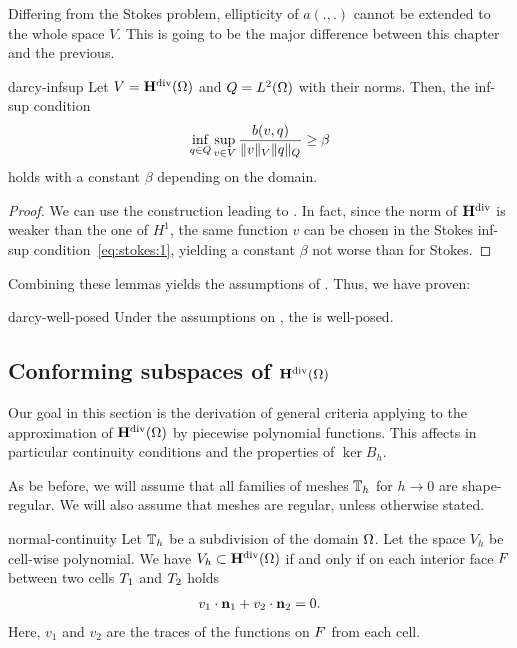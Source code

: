 \begin{remark}
  Differing from the Stokes problem, ellipticity of $a(.,.)$ cannot be
  extended to the whole space $V$. This is going to be the major
  difference between this chapter and the previous.
\end{remark}

\begin{Lemma}{darcy-infsup}
  Let $V=\mathbf H^{\text{div}}(\Omega)$ and $Q=L^2(\Omega)$ with their norms.  Then,
  the inf-sup condition
  \begin{gather}
    \inf_{q\in Q} \sup_{v\in V} \frac{b(v,q)}{\lVert v\rVert_V\lVert q\rVert_Q}
    \ge \beta
  \end{gather}
  holds with a constant $\beta$ depending on the domain.
\end{Lemma}

\begin{proof}
  We can use the construction leading to
  . In fact, since the norm of $\mathbf H^{\text{div}}$
  is weaker than the one of $H^1$, the same function $v$ can be chosen
  in the Stokes inf-sup condition~\eqref{eq:stokes:1}, yielding a
  constant $\beta$ not worse than for Stokes.
\end{proof}

Combining these lemmas yields the assumptions of
. Thus, we have proven:

\begin{Theorem}{darcy-well-posed}
  Under the assumptions on ,
  the  is well-posed.
\end{Theorem}

\subsection{Conforming subspaces of $\mathbf H^{\text{div}}(\Omega)$}

\begin{intro}
  Our goal in this section is the derivation of general criteria
  applying to the approximation of $\mathbf H^{\text{div}}(\Omega)$ by piecewise
  polynomial functions. This affects in particular continuity
  conditions and the properties of $\ker{B_h}$.

  As be before, we will assume that all families of meshes $\mathbb T_h$
  for $h\to 0$ are shape-regular. We will also assume that meshes are
  regular, unless otherwise stated.
\end{intro}

\begin{Lemma}{normal-continuity}
  Let $\mathbb T_h$ be a subdivision of the domain $\Omega$. Let the
  space $V_h$ be cell-wise polynomial. We have $V_h \subset
  \mathbf H^{\text{div}}(\Omega)$ if and only if on each interior face $F$
  between two cells $T_1$ and $T_2$ holds
  \begin{gather}
    v_1 \cdot \mathbf n_1 + v_2 \cdot\mathbf n_2 = 0.
  \end{gather}
  Here, $v_1$ and $v_2$ are the traces of the functions on $F$
  from each cell.
\end{Lemma}

